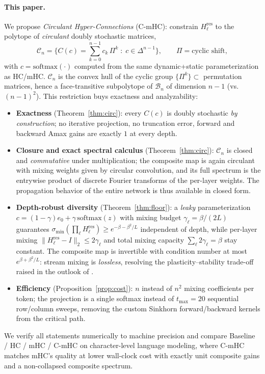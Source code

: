 \documentclass[11pt]{article}
\newcommand{\Hres}{H^{\mathrm{res}}}
\begin{document}
\paragraph{This paper.} We propose \emph{Circulant Hyper-Connections} (C-mHC): constrain $\Hres_\ell$ to the polytope of \emph{circulant} doubly stochastic matrices,
\begin{equation}
\mathcal{C}_n=\Big\{C(c)=\textstyle\sum_{k=0}^{n-1}c_k\,\Pi^k \;:\; c\in\Delta^{n-1}\Big\},\qquad
\Pi=\text{cyclic shift},
\label{eq:circ}
\end{equation}
with $c=\mathrm{softmax}(\cdot)$ computed from the same dynamic+static parameterization as HC/mHC. $\mathcal{C}_n$ is the convex hull of the cyclic group $\{\Pi^k\}\subset$ permutation matrices, hence a face-transitive subpolytope of $\mathcal{B}_n$ of dimension $n-1$ (vs.\ $(n-1)^2$). This restriction buys exactness and analyzability:
\begin{itemize}
\item \textbf{Exactness} (Theorem~\ref{thm:circ}): every $C(c)$ is doubly stochastic \emph{by construction}; no iterative projection, no truncation error, forward and backward Amax gains are exactly $1$ at every depth.
\item \textbf{Closure and exact spectral calculus} (Theorem~\ref{thm:circ}): $\mathcal{C}_n$ is closed and \emph{commutative} under multiplication; the composite map is again circulant with mixing weights given by circular convolution, and its full spectrum is the entrywise product of discrete Fourier transforms of the per-layer weights. The propagation behavior of the entire network is thus available in closed form.
\item \textbf{Depth-robust diversity} (Theorem~\ref{thm:floor}): a \emph{leaky} parameterization $c=(1-\gamma)e_0+\gamma\,\mathrm{softmax}(z)$ with mixing budget $\gamma_\ell=\beta/(2L)$ guarantees $\sigma_{\min}(\prod_\ell \Hres_\ell)\ge e^{-\beta-\beta^2/L}$ independent of depth, while per-layer mixing $\|\Hres_\ell-I\|_2\le2\gamma_\ell$ and total mixing capacity $\sum_\ell 2\gamma_\ell=\beta$ stay constant. The composite map is invertible with condition number at most $e^{\beta+\beta^2/L}$: stream mixing is \emph{lossless}, resolving the plasticity--stability trade-off raised in the outlook of \citet{xie2025mhc}.
\item \textbf{Efficiency} (Proposition~\ref{prop:cost}): $n$ instead of $n^2$ mixing coefficients per token; the projection is a single softmax instead of $t_{\max}=20$ sequential row/column sweeps, removing the custom Sinkhorn forward/backward kernels from the critical path.
\end{itemize}
We verify all statements numerically to machine precision and compare Baseline / HC / mHC / C-mHC on character-level language modeling, where C-mHC matches mHC's quality at lower wall-clock cost with exactly unit composite gains and a non-collapsed composite spectrum.
\end{document}
